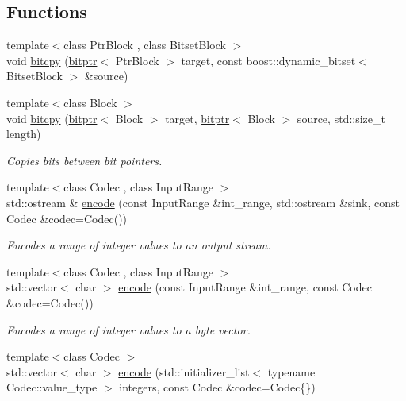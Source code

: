 \subsection*{Functions}
\begin{DoxyCompactItemize}
\item 
{\footnotesize template$<$class Ptr\+Block , class Bitset\+Block $>$ }\\void \mbox{\hyperlink{namespaceirk_ae79f958d4bca4bb9e05628261f2fb725}{bitcpy}} (\mbox{\hyperlink{classirk_1_1bitptr}{bitptr}}$<$ Ptr\+Block $>$ target, const boost\+::dynamic\+\_\+bitset$<$ Bitset\+Block $>$ \&source)
\item 
{\footnotesize template$<$class Block $>$ }\\void \mbox{\hyperlink{namespaceirk_a339a0543200e91f59773f625063c959c}{bitcpy}} (\mbox{\hyperlink{classirk_1_1bitptr}{bitptr}}$<$ Block $>$ target, \mbox{\hyperlink{classirk_1_1bitptr}{bitptr}}$<$ Block $>$ source, std\+::size\+\_\+t length)
\begin{DoxyCompactList}\small\item\em Copies bits between bit pointers. \end{DoxyCompactList}\item 
{\footnotesize template$<$class Codec , class Input\+Range $>$ }\\std\+::ostream \& \mbox{\hyperlink{namespaceirk_ae6ff93ae9ba08469e917652442a288b2}{encode}} (const Input\+Range \&int\+\_\+range, std\+::ostream \&sink, const Codec \&codec=Codec())
\begin{DoxyCompactList}\small\item\em Encodes a range of integer values to an output stream. \end{DoxyCompactList}\item 
{\footnotesize template$<$class Codec , class Input\+Range $>$ }\\std\+::vector$<$ char $>$ \mbox{\hyperlink{namespaceirk_a5ff7324ee83ee713f6184883642c2713}{encode}} (const Input\+Range \&int\+\_\+range, const Codec \&codec=Codec())
\begin{DoxyCompactList}\small\item\em Encodes a range of integer values to a byte vector. \end{DoxyCompactList}\item 
{\footnotesize template$<$class Codec $>$ }\\std\+::vector$<$ char $>$ \mbox{\hyperlink{namespaceirk_ad1f30da1af48df56b32a99c59af8412a}{encode}} (std\+::initializer\+\_\+list$<$ typename Codec\+::value\+\_\+type $>$ integers, const Codec \&codec=Codec\{\})

\end{DoxyCompactItemize}
